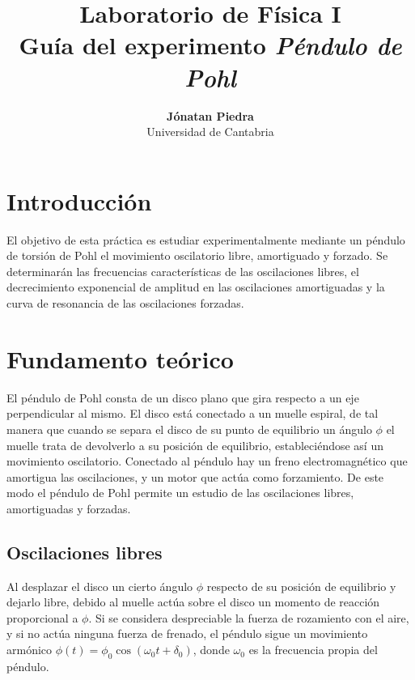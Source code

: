 \documentclass[11pt]{articulo}
\begin{document}
\title{\bf Laboratorio de F\'isica I\\
  Gu\'ia del experimento \emph{P\'endulo de Pohl}}
\author{
  {\bf J\'onatan Piedra}\\
  Universidad de Cantabria}
\maketitle


\section{Introducci\'on}

El objetivo de esta pr\'actica es estudiar experimentalmente mediante un p\'endulo de torsi\'on de Pohl el movimiento oscilatorio libre, amortiguado y forzado. Se determinar\'an las frecuencias caracter\'isticas de las oscilaciones libres, el decrecimiento exponencial de amplitud en las oscilaciones amortiguadas y la curva de resonancia de las oscilaciones forzadas.


\section{Fundamento te\'orico}

El p\'endulo de Pohl consta de un disco plano que gira respecto a un eje perpendicular al mismo. El disco est\'a conectado a un muelle espiral, de tal manera que cuando se separa el disco de su punto de equilibrio un \'angulo $\phi$ el muelle trata de devolverlo a su posici\'on de equilibrio, estableci\'endose as\'i un movimiento oscilatorio. Conectado al p\'endulo hay un freno electromagn\'etico que amortigua las oscilaciones, y un motor que act\'ua como forzamiento. De este modo el p\'endulo de Pohl permite un estudio de las oscilaciones libres, amortiguadas y forzadas.

\subsection{Oscilaciones libres}

Al desplazar el disco un cierto \'angulo $\phi$ respecto de su posici\'on de equilibrio y dejarlo libre, debido al muelle act\'ua sobre el disco un momento de reacci\'on proporcional a $\phi$. Si se considera despreciable la fuerza de rozamiento con el aire, y si no act\'ua ninguna fuerza de frenado, el p\'endulo sigue un movimiento arm\'onico $\phi (t) = \phi_0 \cos (\omega_0 t + \delta_0)$, donde $\omega_0$ es la frecuencia propia del p\'endulo.
\end{document}
